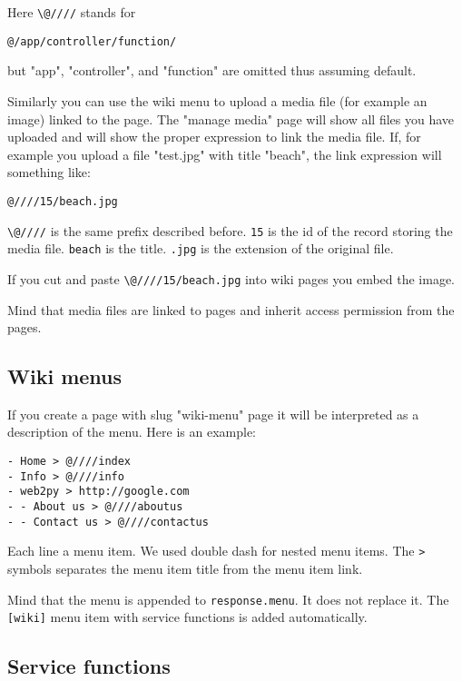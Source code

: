 \documentclass[justified,sixbynine,notoc]{tufte-book}
\def\ft{\small\tt}
\begin{document}
\begin{fullwidth}
Here {\ft {\textbackslash}@////} stands for

\begin{lstlisting}
@/app/controller/function/
\end{lstlisting}
\noindent but "app", "controller", and "function" are omitted thus assuming default.

Similarly you can use the wiki menu to upload a media file (for example an image) linked to the page. The "manage media" page will show all files you have uploaded and will show the proper expression to link the media file. If, for example you upload a file "test.jpg" with title "beach", the link expression will something like:

\begin{lstlisting}
@////15/beach.jpg
\end{lstlisting}

{\ft {\textbackslash}@////} is the same prefix described before. {\ft 15} is the id of the record storing the media file. {\ft beach} is the title. {\ft .jpg} is the extension of the original file.

If you cut and paste {\ft {\textbackslash}@////15/beach.jpg} into wiki pages you embed the image.

Mind that media files are linked to pages and inherit access permission from the pages.

\goodbreak\subsection{Wiki menus}

If you create a page with slug "wiki-menu" page it will be interpreted as a description of the menu. Here is an example:

\begin{lstlisting}
- Home > @////index
- Info > @////info
- web2py > http://google.com
- - About us > @////aboutus
- - Contact us > @////contactus
\end{lstlisting}

Each line a menu item. We used double dash for nested menu items. The {\ft >} symbols separates the menu item title from the menu item link.

Mind that the menu is appended to {\ft response.menu}. It does not replace it. The {\ft [wiki]} menu item with service functions is added automatically.

\goodbreak\subsection{Service functions}


\end{fullwidth}
\end{document}
